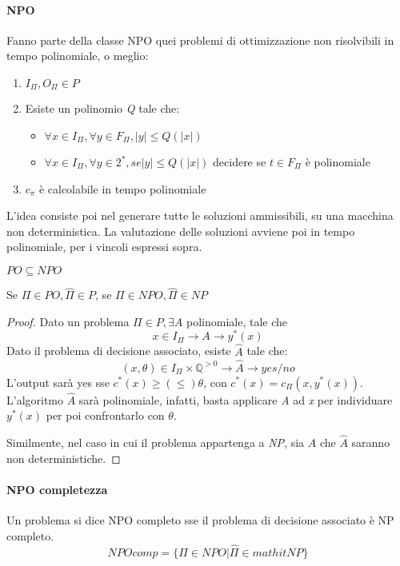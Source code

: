 \paragraph{NPO}
Fanno parte della classe NPO quei problemi di ottimizzazione non risolvibili 
in tempo polinomiale, o meglio:
\begin{enumerate}
    \item $I_\Pi, O_\Pi \in P$
    \item Esiste un polinomio \emph{Q} tale che:
        \begin{itemize}
            \item $\forall x \in I_\Pi, \forall y \in F_\Pi, |y| \leq Q(|x|)$
            \item $\forall x \in I_\Pi, \forall y \in 2^*, se |y| \leq Q(|x|)$ decidere
            se $t \in F_\Pi$ è polinomiale
        \end{itemize}
    \item $c_\pi$ è calcolabile in tempo polinomiale
\end{enumerate}
L'idea consiste poi nel generare tutte le soluzioni ammissibili, su una macchina 
non deterministica.
La valutazione delle soluzioni avviene poi in tempo polinomiale, per i vincoli espressi
sopra.

\begin{theorem}
    $PO \subseteq NPO$
\end{theorem}
\begin{theorem}
    Se $\Pi \in \mathit{PO}, \hat{\Pi} \in P$, 
    se $\Pi \in \mathit{NPO}, \hat{\Pi} \in \mathit{NP}$ 
\end{theorem}
\begin{proof}
    Dato un problema $\Pi \in P, \exists A$ polinomiale, tale che
    $$x \in I_\Pi \longrightarrow A \longrightarrow y^*(x)$$
    Dato il problema di decisione associato, esiste $\hat{A}$ tale che:
    $$(x, \theta) \in I_\Pi \times \mathbb{Q}^{>0} \longrightarrow \hat{A} \longrightarrow yes/no$$
    L'output sarà yes sse $c^*(x) \geq (\leq) \theta$, con $c^*(x) = c_\Pi(x, y^*(x))$.\\
    
    L'algoritmo $\hat{A}$ sarà polinomiale, infatti, basta applicare \emph{A} ad \emph{x} 
    per individuare $y^*(x)$ per poi confrontarlo con $\theta$. 

    Similmente, nel caso in cui il problema appartenga a \emph{NP}, sia $A$ che $\hat{A}$ saranno non
    deterministiche.
\end{proof}

\paragraph{NPO completezza}
Un problema si dice NPO completo sse il problema di decisione associato è NP completo.\\
$$\mathit{NPOcomp} = \{\Pi \in \mathit{NPO} | \hat{\Pi} \in mathit{NP}\}$$

